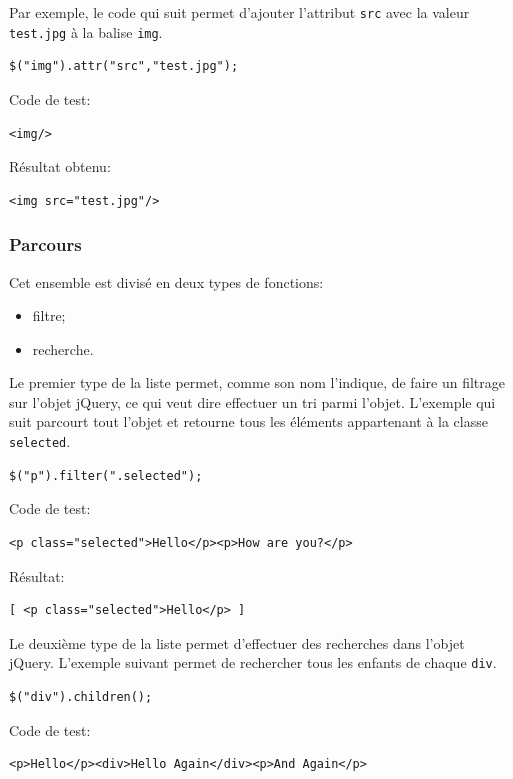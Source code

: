 \documentclass[10pt,a4paper,titlepage]{article}
\begin{document}
Par exemple, le code qui suit permet d'ajouter l'attribut \texttt{src} avec la valeur \texttt{test.jpg} à la balise \texttt{img}.

\begin{lstlisting}
$("img").attr("src","test.jpg");
\end{lstlisting}


Code de test:
\begin{lstlisting}
<img/>
\end{lstlisting}


Résultat obtenu:
\begin{lstlisting}
<img src="test.jpg"/>
\end{lstlisting}

\subsubsection{Parcours}
Cet ensemble est divisé en deux types de fonctions:
\begin{itemize}
	\item filtre;
	\item recherche.\\
\end{itemize}

Le premier type de la liste permet, comme son nom l'indique, de faire un filtrage sur l'objet jQuery, ce qui veut dire effectuer un tri parmi l'objet. L'exemple qui suit parcourt tout l'objet et retourne tous les éléments appartenant à la classe \texttt{selected}.

\begin{lstlisting}
$("p").filter(".selected");
\end{lstlisting}

Code de test:
\begin{lstlisting}
<p class="selected">Hello</p><p>How are you?</p>
\end{lstlisting}

Résultat:
\begin{lstlisting}
[ <p class="selected">Hello</p> ]
\end{lstlisting}

Le deuxième type de la liste permet d'effectuer des recherches dans l'objet jQuery. L'exemple suivant permet de rechercher tous les enfants de chaque \texttt{div}.

\begin{lstlisting}
$("div").children();
\end{lstlisting}


Code de test:
\begin{lstlisting}
<p>Hello</p><div>Hello Again</div><p>And Again</p>
\end{lstlisting}
\end{document}

